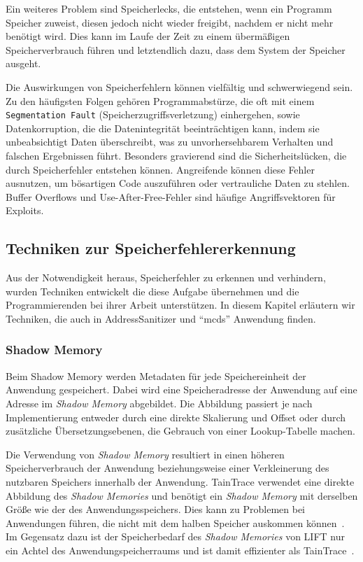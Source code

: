 \documentclass[acmtog,nonacm]{acmart}
\begin{document}


Ein weiteres Problem sind Speicherlecks, die entstehen, wenn ein Programm
Speicher zuweist, diesen jedoch nicht wieder freigibt, nachdem er nicht mehr
benötigt wird. Dies kann im Laufe der Zeit zu einem übermäßigen
Speicherverbrauch führen und letztendlich dazu, dass dem System der Speicher
ausgeht.


Die Auswirkungen von Speicherfehlern können vielfältig und schwerwiegend sein.
Zu den häufigsten Folgen gehören Programmabstürze, die oft mit einem
\verb|Segmentation Fault| (Speicherzugriffsverletzung) einhergehen, sowie
Datenkorruption, die die Datenintegrität beeinträchtigen kann, indem sie
unbeabsichtigt Daten überschreibt, was zu unvorhersehbarem Verhalten und
falschen Ergebnissen führt. Besonders gravierend sind die Sicherheitslücken,
die durch Speicherfehler entstehen können. Angreifende können diese Fehler
ausnutzen, um bösartigen Code auszuführen oder vertrauliche Daten zu stehlen.
Buffer Overflows und Use-After-Free-Fehler sind häufige Angriffsvektoren für
Exploits.

\subsection{Techniken zur Speicherfehlererkennung}

Aus der Notwendigkeit heraus, Speicherfehler zu erkennen und verhindern, wurden
Techniken entwickelt die diese Aufgabe übernehmen und die Programmierenden bei
ihrer Arbeit unterstützen. In diesem Kapitel erläutern wir Techniken, die auch in AddressSanitizer und "`mcds"' Anwendung finden.

\subsubsection{Shadow Memory}\label{sec:shadow-memory}

Beim Shadow Memory werden Metadaten für jede Speichereinheit der Anwendung
gespeichert. Dabei wird eine Speicheradresse der Anwendung auf eine Adresse im
\textit{Shadow Memory} abgebildet. Die Abbildung passiert je nach
Implementierung entweder durch eine direkte Skalierung und Offset oder durch
zusätzliche Übersetzungsebenen, die Gebrauch von einer Lookup-Tabelle machen.

Die Verwendung von \textit{Shadow Memory} resultiert in einen höheren
Speicherverbrauch der Anwendung beziehungsweise einer Verkleinerung des
nutzbaren Speichers innerhalb der Anwendung. TainTrace verwendet eine
direkte Abbildung des \textit{Shadow Memories} und benötigt ein \textit{Shadow
  Memory} mit derselben Größe wie der des Anwendungsspeichers. Dies kann zu
Problemen bei Anwendungen führen, die nicht mit dem halben Speicher auskommen
können~\cite{taint_trace_2006}. Im Gegensatz dazu ist der Speicherbedarf des
\textit{Shadow Memories} von LIFT nur ein Achtel des
Anwendungspeicherraums und ist damit effizienter als
TainTrace~\cite{lift_2006}.
\end{document}
